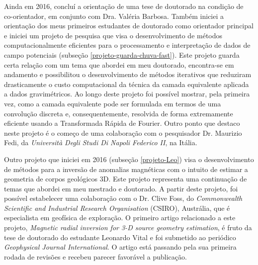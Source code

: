 Ainda em 2016, concluí a orientação de uma tese de doutorado na condição de 
co-orientador, em conjunto com Dra. Valéria Barbosa. Também iniciei a orientação 
dos meus primeiros estudantes de doutorado como orientador principal e iniciei um 
projeto de pesquisa que visa o desenvolvimento de métodos computacionalmente eficientes 
para o processamento e interpretação de dados de campo potenciais (subseção 
\ref{projeto-guarda-chuva-fast}). Este projeto guarda certa relação com um tema que 
abordei em meu doutorado, encontra-se em andamento e possibilitou o 
desenvolvimento de métodos iterativos que reduziram drasticamente o custo computacional
da técnica da camada equivalente aplicada a dados gravimétricos. 
Ao longo deste projeto foi possível mostrar, pela primeira vez, 
como a camada equivalente pode ser formulada em termos de uma convolução discreta e,
consequentemente, resolvida de forma extremamente eficiente usando a Transformada 
Rápida de Fourier. 
Outro ponto que destaco neste projeto é o começo de uma colaboração com o pesquisador 
Dr. Maurizio Fedi, da \textit{Università Degli Studi Di Napoli Federico II}, na Itália.

Outro projeto que iniciei em 2016 (subseção \ref{projeto-Leo}) visa o desenvolvimento 
de métodos para a inversão de anomalias magnéticas com o intuito de estimar a geometria 
de corpos geológicos 3D. Este projeto representa uma continuação de temas que abordei 
em meu mestrado e doutorado. A partir deste projeto, foi possível estabelecer uma 
colaboração com o Dr. Clive Foss, do \textit{Commonwealth Scientific and Industrial 
Research Organisation} (CSIRO), Austrália, que é especialista em geofísica de exploração. 
O primeiro artigo relacionado a este projeto, \textit{Magnetic radial inversion for 3-D 
source geometry estimation}, é fruto da tese de doutorado do estudante Leonardo Vital 
e foi submetido ao periódico \textit{Geophysical Journal International}. O artigo está 
passando pela sua primeira rodada de revisões e recebeu parecer favorável a publicação.

